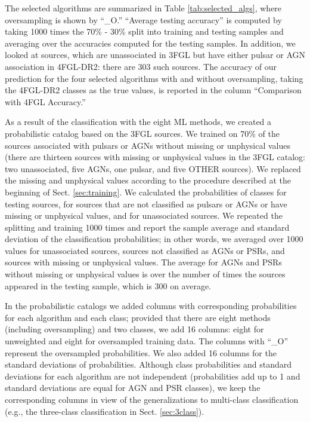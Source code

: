 \documentclass[referee]{aa} %
\begin{document}
The selected algorithms are summarized in Table \ref{tab:selected_algs}, where oversampling is shown by ``\_O.''
``Average testing accuracy'' is computed by taking 1000 times the 70\% - 30\% split into training and testing samples and averaging over the 
accuracies computed for the testing samples.
In addition, we looked at sources, which are unassociated in 3FGL but have either pulsar or AGN association in 4FGL-DR2: there are 303 such sources.
The accuracy of our prediction for the four selected algorithms with and without oversampling, taking the 4FGL-DR2 classes as the true values, is reported in the column ``Comparison with 4FGL Accuracy.''

As a result of the classification with the eight ML methods,
we created a probabilistic catalog based on the 3FGL sources.
We trained on 70\% of the sources associated with pulsars or AGNs without missing or unphysical values 
(there are thirteen sources with missing or unphysical values in the 3FGL catalog: two unassociated, five AGNs, one pulsar, and five OTHER sources).
We replaced the missing and unphysical values according to the procedure described at the beginning of Sect. \ref{sec:training}.
We calculated the probabilities of classes for testing sources, for sources that are not classified as pulsars or AGNs or have missing or unphysical values, and for unassociated sources.
We repeated the splitting and training 1000 times and report the sample average and standard deviation of the classification probabilities; in other words, we averaged over 1000 values for unassociated sources, sources not classified as AGNs or PSRs, and sources with missing or unphysical values. The average for AGNs and PSRs without missing or unphysical values is over the number of times the sources appeared in the testing sample, which is 300 on average.


In the probabilistic catalogs we added columns with corresponding probabilities for each algorithm and each class; provided that there are eight methods (including oversampling) and two classes, we add 16 columns: eight for unweighted and eight for oversampled training data. The columns with ``\_O'' represent the oversampled probabilities. We also added 16 columns for the standard deviations of probabilities. Although class probabilities and standard deviations for each algorithm are not independent (probabilities add up to 1 and standard deviations are equal for AGN and PSR classes), we keep the corresponding columns in view of the generalizations to multi-class classification (e.g., the three-class classification in Sect. \ref{sec:3class}).
\end{document}
